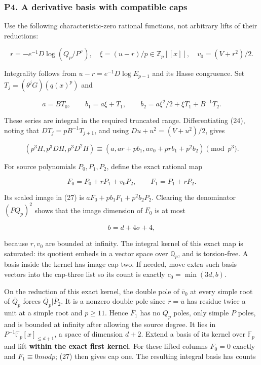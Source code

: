 \documentclass[11pt,a4paper]{article}
\begin{document}
\hypertarget{p4.-a-derivative-basis-with-compatible-caps}{%
\subsubsection{P4. A derivative basis with compatible caps}\label{p4.-a-derivative-basis-with-compatible-caps}}

Use the following characteristic-zero rational functions, not arbitrary lifts of their reductions:

\[
r=-e^{-1}D\log(Q_p/P^\sigma),\quad
\xi=(u-r)/p\in\mathbb Z_p[[x]],\quad v_0=(V+r^2)/2.
\]

Integrality follows from \(u-r=e^{-1}D \operatorname{log} E_{p-1}\) and its Hasse congruence. Set \(T_j=(θ^jG)(q(x)^p)\) and

\[
a=BT_0,\qquad b_1=a\xi+T_1,\qquad
b_2=a\xi^2/2+\xi T_1+B^{-1}T_2.
\]

These series are integral in the required truncated range. Differentiating (24), noting that \(D T_j=pB^{-1}T_{j+1}\), and using \(Du+u^{2}=(V+u^{2})/2\), gives

\[
(p^3H,p^3DH,p^3D^2H)
\equiv(a,ar+pb_1,av_0+prb_1+p^2b_2)\pmod{p^3}.\tag{27}
\]

For source polynomials \(P_{0},P_{1},P_{2}\), define the exact rational map

\[
F_0=P_0+rP_1+v_0P_2,\qquad F_1=P_1+rP_2.
\]

Its scaled image in (27) is \(aF_{0}+pb_{1}F_{1}+p^{2}b_{2}P_{2}\). Clearing the denominator \((PQ_p)^{2}\) shows that the image dimension of \(F_{0}\) is at most

\[
b=d+4\sigma+4,
\]

because \(r,v_{0}\) are bounded at infinity. The integral kernel of this exact map is saturated: its quotient embeds in a vector space over \(\mathbb{Q}_p\), and is torsion-free. A basis inside the kernel has image cap two. If needed, move extra such basis vectors into the cap-three list so its count is exactly \(c_{0}=\operatorname{min}(3d,b)\).

On the reduction of this exact kernel, the double pole of \(\overline{v}_{0}\) at every simple root of \(\overline{Q}_p\) forces \(\overline{Q}_p|\overline{P}_{2}\). It is a nonzero double pole since \(\overline{r}=\overline{u}\) has residue twice a unit at a simple root and \(p≥11\). Hence \(\overline{F}_{1}\) has no \(Q_p\) poles, only simple \(P\) poles, and is bounded at infinity after allowing the source degree. It lies in \(P^{-1}\mathbb{F}_p[x]_{≤d+1}\), a space of dimension \(d+2\). Extend a basis of its kernel over \(\mathbb{F}_p\) and lift \textbf{within the exact first kernel}. For these lifted columns \(F_{0}=0\) exactly and \(F_{1}≡0 mod p\); (27) then gives cap one. The resulting integral basis has counts
\end{document}
